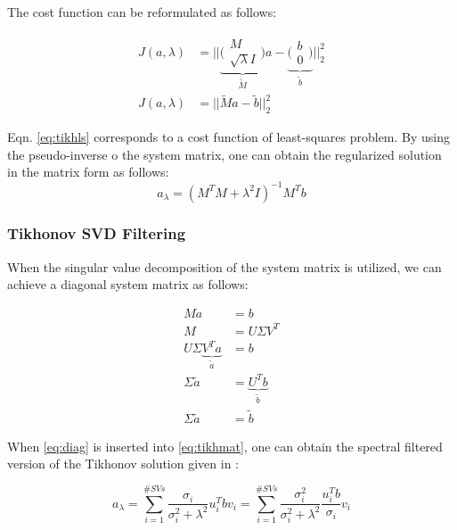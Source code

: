 \documentclass[draftcls, onecolumn, journal]{IEEEtran}
\begin{document}
The cost function can be reformulated as follows: 

\begin{align}
    J(a, \lambda) &= ||\underbrace{\big(\begin{smallmatrix}
        M \\
        \sqrt{\lambda}I 
      \end{smallmatrix}\big)}_{\tilde{M}} a - \underbrace{\big(\begin{smallmatrix}
        b \\
        0 
      \end{smallmatrix}\big)}_{\tilde{b}} ||_2^2 \\
      J(a, \lambda) &= ||\tilde{M}a-\tilde{b}||_2^2 \label{eq:tikhls}
\end{align}

Eqn. \eqref{eq:tikhls} corresponds to a cost function of least-squares problem. By using the pseudo-inverse o the system matrix, one can obtain the regularized solution in the matrix form as follows: 
\begin{equation}
    a_{\lambda} = (M^TM + \lambda^2I)^{-1}M^Tb \label{eq:tikhmat}
\end{equation}

\subsubsection{Tikhonov SVD Filtering}

When the singular value decomposition of the system matrix is utilized, we can achieve a diagonal system matrix as follows: 

\begin{align}
    Ma &= b \\
    M &= U{\Sigma}V^T \\
    U\Sigma\underbrace{V^Ta}_{\tilde{a}} &= b \\
    \Sigma\tilde{a} &= \underbrace{U^Tb}_{\tilde{b}} \\
    \Sigma\tilde{a} &= \tilde{b} \label{eq:diag}
\end{align}

When \eqref{eq:diag} is inserted into \eqref{eq:tikhmat}, one can obtain the spectral filtered version of the Tikhonov solution given in \cite*{Cunha13} :

\begin{equation}
    a_{\lambda} = \sum\limits_{i=1}^{\#SVs} \frac{\sigma_i}{\sigma_i^2 + \lambda^2} u_i^Tbv_i = \sum\limits_{i=1}^{\#SVs} \frac{\sigma_i^2}{\sigma_i^2 + \lambda^2} \frac{u_i^Tb}{\sigma_i}v_i
    \label{eq:tikhsvd}
\end{equation}
\end{document}
